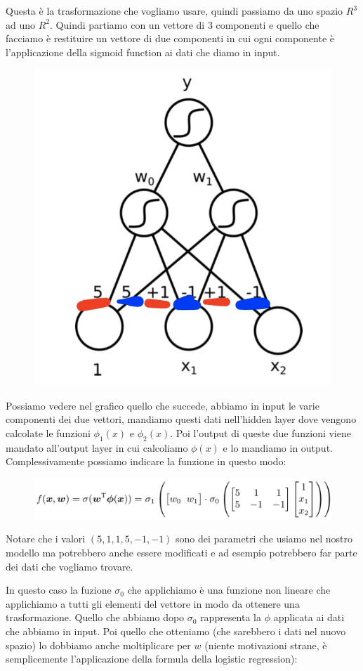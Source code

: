 \documentclass[14pt]{extreport}
\begin{document}
Questa è la trasformazione che vogliamo usare, quindi passiamo da uno spazio $R^3$ ad uno $R^2$. Quindi partiamo con un vettore di 3 componenti e
quello che facciamo è restituire un vettore di due componenti in cui ogni componente è l'applicazione della sigmoid function ai dati che diamo in
input.

\begin{figure}[H]
	\centering
	\includegraphics[width=0.5\linewidth]{361.jpeg}
\end{figure}

Possiamo vedere nel grafico quello che succede, abbiamo in input le varie componenti dei due vettori, mandiamo questi dati nell'hidden layer dove
vengono calcolate le funzioni $\phi_1(x)$ e $\phi_2(x)$. Poi l'output di queste due funzioni viene mandato all'output layer in cui calcoliamo
$\phi(x)$ e lo mandiamo in output. Complessivamente possiamo indicare la funzione in questo modo:

\begin{figure}[H]
	\centering
	\includegraphics[width=0.9\linewidth]{362.jpeg}
\end{figure}



Notare che i valori $(5,1,1,5,-1,-1)$ sono dei parametri che usiamo nel nostro modello ma potrebbero anche essere modificati e ad esempio potrebbero
far parte dei dati che vogliamo trovare.

In questo caso la fuzione $\sigma_0$ che applichiamo è una funzione non lineare che applichiamo a tutti gli elementi del vettore in modo da ottenere
una trasformazione. Quello che abbiamo dopo $\sigma_0$ rappresenta la $\phi$ applicata ai dati che abbiamo in input. Poi quello che otteniamo (che
sarebbero i dati nel nuovo spazio) lo dobbiamo anche moltiplicare per $w$ (niente motivazioni strane, è semplicemente l'applicazione della formula
della logistic regression):
\end{document}
